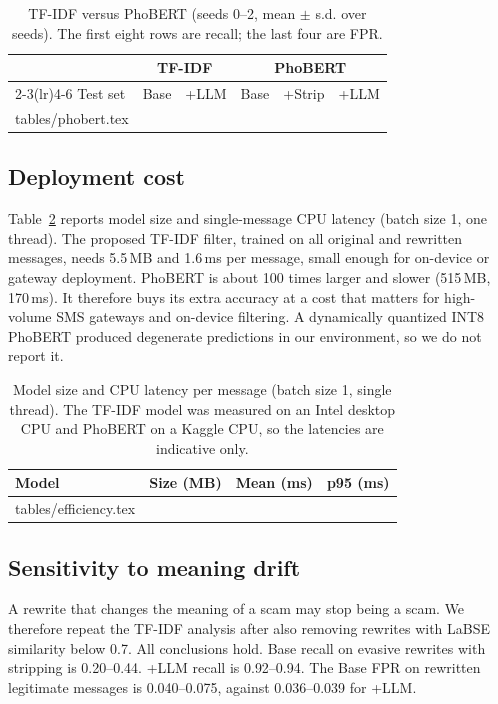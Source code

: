 \documentclass[11pt,a4paper]{article}
\begin{document}
\begin{table}[t]
\centering
\caption{TF-IDF versus PhoBERT (seeds 0--2, mean $\pm$ s.d. over seeds). The first eight rows are recall; the last four are FPR.}
\label{tab:phobert}
\small
\begin{tabular}{lccccc}
\toprule
 & \multicolumn{2}{c}{TF-IDF} & \multicolumn{3}{c}{PhoBERT} \\
\cmidrule(lr){2-3}\cmidrule(lr){4-6}
Test set & Base & +LLM & Base & +Strip & +LLM \\
\midrule
{} tables/phobert.tex
\bottomrule
\end{tabular}
\end{table}

\subsection{Deployment cost}
Table~\ref{tab:eff} reports model size and single-message CPU latency (batch size 1, one thread). The proposed TF-IDF filter, trained on all original and rewritten messages, needs 5.5\,MB and 1.6\,ms per message, small enough for on-device or gateway deployment. PhoBERT is about 100 times larger and slower (515\,MB, 170\,ms). It therefore buys its extra accuracy at a cost that matters for high-volume SMS gateways and on-device filtering. A dynamically quantized INT8 PhoBERT produced degenerate predictions in our environment, so we do not report it.

\begin{table}[t]
\centering
\caption{Model size and CPU latency per message (batch size 1, single thread). The TF-IDF model was measured on an Intel desktop CPU and PhoBERT on a Kaggle CPU, so the latencies are indicative only.}
\label{tab:eff}
\small
\begin{tabular}{lrrr}
\toprule
Model & Size (MB) & Mean (ms) & p95 (ms) \\
\midrule
{} tables/efficiency.tex
\bottomrule
\end{tabular}
\end{table}

\subsection{Sensitivity to meaning drift}\label{sec:sens}
A rewrite that changes the meaning of a scam may stop being a scam. We therefore repeat the TF-IDF analysis after also removing rewrites with LaBSE similarity below 0.7. All conclusions hold. Base recall on evasive rewrites with stripping is 0.20--0.44. +LLM recall is 0.92--0.94. The Base FPR on rewritten legitimate messages is 0.040--0.075, against 0.036--0.039 for +LLM.
\end{document}
